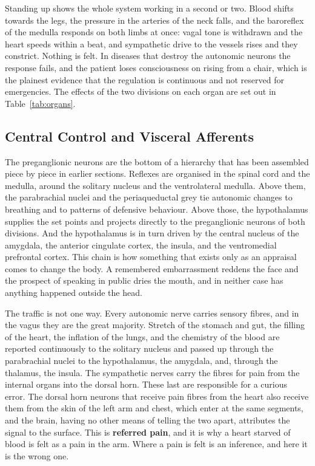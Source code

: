 \documentclass[11pt]{article}
\begin{document}
Standing up shows the whole system working in a second or two. Blood shifts towards the legs, the pressure in the arteries of the neck falls, and the baroreflex of the medulla responds on both limbs at once: vagal tone is withdrawn and the heart speeds within a beat, and sympathetic drive to the vessels rises and they constrict. Nothing is felt. In diseases that destroy the autonomic neurons the response fails, and the patient loses consciousness on rising from a chair, which is the plainest evidence that the regulation is continuous and not reserved for emergencies. The effects of the two divisions on each organ are set out in Table~\ref{tab:organs}.

\subsection{Central Control and Visceral Afferents}

The preganglionic neurons are the bottom of a hierarchy that has been assembled piece by piece in earlier sections. Reflexes are organised in the spinal cord and the medulla, around the solitary nucleus and the ventrolateral medulla. Above them, the parabrachial nuclei and the periaqueductal grey tie autonomic changes to breathing and to patterns of defensive behaviour. Above those, the hypothalamus supplies the set points and projects directly to the preganglionic neurons of both divisions. And the hypothalamus is in turn driven by the central nucleus of the amygdala, the anterior cingulate cortex, the insula, and the ventromedial prefrontal cortex. This chain is how something that exists only as an appraisal comes to change the body. A remembered embarrassment reddens the face and the prospect of speaking in public dries the mouth, and in neither case has anything happened outside the head.

The traffic is not one way. Every autonomic nerve carries sensory fibres, and in the vagus they are the great majority. Stretch of the stomach and gut, the filling of the heart, the inflation of the lungs, and the chemistry of the blood are reported continuously to the solitary nucleus and passed up through the parabrachial nuclei to the hypothalamus, the amygdala, and, through the thalamus, the insula. The sympathetic nerves carry the fibres for pain from the internal organs into the dorsal horn. These last are responsible for a curious error. The dorsal horn neurons that receive pain fibres from the heart also receive them from the skin of the left arm and chest, which enter at the same segments, and the brain, having no other means of telling the two apart, attributes the signal to the surface. This is \textbf{referred pain}, and it is why a heart starved of blood is felt as a pain in the arm. Where a pain is felt is an inference, and here it is the wrong one.
\end{document}
